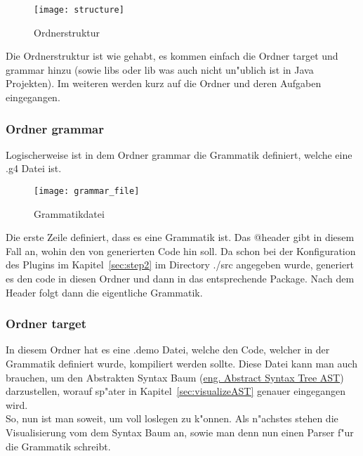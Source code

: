 \begin{figure}[H]
	\centering
	\texttt{[image: structure]}
	\caption{\antlr Ordnerstruktur}
\end{figure}

Die Ordnerstruktur ist wie gehabt, es kommen einfach die Ordner target und grammar hinzu (sowie libs oder lib was auch nicht un"ublich ist in Java Projekten). Im weiteren werden kurz auf die Ordner und deren Aufgaben eingegangen.

\subsubsection{Ordner grammar}
Logischerweise ist in dem Ordner grammar die Grammatik definiert, welche eine .g4 Datei ist. 

\begin{figure}[H]
	\centering
	\texttt{[image: grammar\_file]}
	\caption{\antlr Grammatikdatei}
\end{figure}

Die erste Zeile definiert, dass es eine Grammatik ist. Das @header gibt in diesem Fall an, wohin den von \antlr generierten Code hin soll. Da schon bei der Konfiguration des Plugins im Kapitel~\ref{sec:step2} im Directory ./src angegeben wurde, generiert es den code in diesen Ordner und dann in das entsprechende Package. Nach dem Header folgt dann die eigentliche Grammatik.

\subsubsection{Ordner target}
In diesem Ordner hat es eine .demo Datei, welche den Code, welcher in der Grammatik definiert wurde, kompiliert werden sollte. Diese Datei kann man auch brauchen, um den Abstrakten Syntax Baum (\href{https://en.wikipedia.org/wiki/Abstract_syntax_tree}{eng. Abstract Syntax Tree AST}) darzustellen, worauf sp"ater in Kapitel~\ref{sec:visualizeAST} genauer eingegangen wird. \\

So, nun ist man soweit, um voll loslegen zu k"onnen. Als n"achstes stehen die Visualisierung vom dem Syntax Baum an, sowie man denn nun einen Parser f"ur die Grammatik schreibt. 
